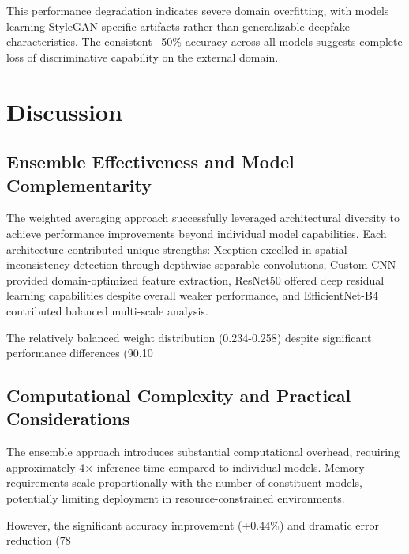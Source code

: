\documentclass[conference]{IEEEtran}
\begin{document}
This performance degradation indicates severe domain overfitting, with models learning StyleGAN-specific artifacts rather than generalizable deepfake characteristics. The consistent ~50\% accuracy across all models suggests complete loss of discriminative capability on the external domain.

\section{Discussion}

\subsection{Ensemble Effectiveness and Model Complementarity}

The weighted averaging approach successfully leveraged architectural diversity to achieve performance improvements beyond individual model capabilities. Each architecture contributed unique strengths: Xception excelled in spatial inconsistency detection through depthwise separable convolutions, Custom CNN provided domain-optimized feature extraction, ResNet50 offered deep residual learning capabilities despite overall weaker performance, and EfficientNet-B4 contributed balanced multi-scale analysis.

The relatively balanced weight distribution (0.234-0.258) despite significant performance differences (90.10%

\subsection{Computational Complexity and Practical Considerations}

The ensemble approach introduces substantial computational overhead, requiring approximately 4× inference time compared to individual models. Memory requirements scale proportionally with the number of constituent models, potentially limiting deployment in resource-constrained environments.

However, the significant accuracy improvement (+0.44\%) and dramatic error reduction (78%
\end{document}
